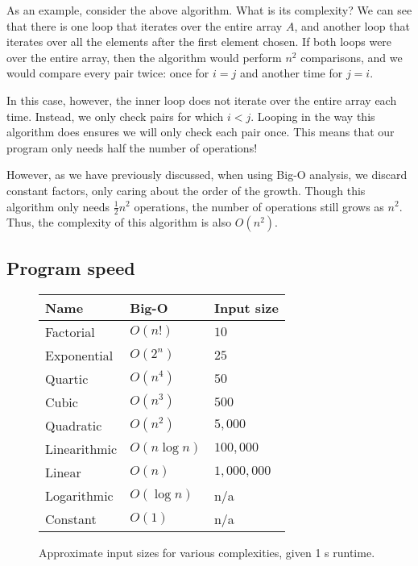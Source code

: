 As an example, consider the above algorithm. What is its complexity?  We can see that there is one loop that iterates over the entire array $ A $, and another loop that iterates over all the elements after the first element chosen.  If both loops were over the entire array, then the algorithm would perform $ n^2 $ comparisons, and we would compare every pair twice: once for $ i = j $ and another time for $ j = i $.

In this case, however, the inner loop does not iterate over the entire array each time. Instead, we only check pairs for which $ i < j $. Looping in the way this algorithm does ensures we will only check each pair once. This means that our program only needs half the number of operations!

However, as we have previously discussed, when using Big-O analysis, we discard constant factors, only caring about the order of the growth.  Though this algorithm only needs $ \frac{1}{2}n^2 $ operations, the number of operations still grows as $n^2$.  Thus, the complexity of this algorithm is also $ O(n^2) $.


\subsection{Program speed}

\begin{figure}
\centering
\begin{tabular}{| l | l | l |}
  \hline
  \textbf{Name} & \textbf{Big-O} & \textbf{Input size}  \\ \hline
  Factorial    & $ O(n!) $      & $ 10 $ \\ \hline
  Exponential  & $ O(2^n) $     & $ 25 $ \\ \hline
  Quartic      & $ O(n^4) $     & $ 50 $ \\ \hline
  Cubic        & $ O(n^3) $     & $ 500 $ \\ \hline
  Quadratic    & $ O(n^2) $     & $ 5,000 $ \\ \hline
  Linearithmic & $ O(n\log n) $ & $ 100,000 $ \\ \hline
  Linear       & $ O(n) $       & $ 1,000,000 $ \\ \hline
  Logarithmic  & $ O(\log n) $  & n/a\footnotemark[1] \\ \hline
  Constant     & $ O(1) $       & n/a\footnotemark[1] \\ \hline
\end{tabular}
\caption{Approximate input sizes for various complexities, given 1 s runtime.}
\label{input-size-table}
\end{figure}


